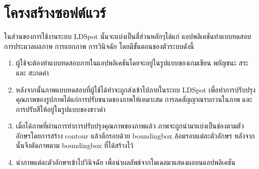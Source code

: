 \documentclass[12pt,oneside,openright,a4paper]{cpe-thai-project}
\begin{document}
\section{โครงสร้างซอฟต์แวร์}
ในส่วนของการใช้งานระบบ LDSpot นั้นจะแบ่งเป็นสี่ส่วนหลักๆได้แก่ แอปพลิเคชันทำแบบทดสอบ การประมวลผลภาพ การแยกภาพ การวินิจฉัย โดยมีขั้นตอนของตัวระบบดังนี้
\begin{enumerate}
  \item ผู้ใช้จะต้องทำแบบทดสอบภายในแอปพลิเคชันโดยจะอยู่ในรูปแบบของเกมเขียน พยัญชนะ สระ และ สะกดคำ
  \item หลังจากนั้นภาพแบบทดสอบที่ผู้ใช้ได้ทำจะถูกส่งเข้าไปภายในระบบ LDSpot เพื่อทำการปรับปรุงคุณภาพของรูปภาพได้แก่การปรับขนาดของภาพให้เหมาะสม การลดสัญญาณรบกวนในภาพ และการปรับสีให้อยู่ในรูปแบบของขาวดำ
  \item เมื่อได้ภาพที่ผ่านการทำการปรับปรุงคุณภาพของภาพแล้ว ภาพจะถูกนำมาแบ่งเป็นช่องตามตัวอักษรโดยการสร้าง contour แล้วตีกรอบด้วย boundingbox ล้อมรอบแต่ละตัวอักษร หลังจากนั้นจึงตัดภาพตาม boundingbox ที่ได้สร้างไว้
  \item นำภาพแต่ละตัวอักษรเข้าไปวินิจฉัย เพื่อนำผลลัพธ์จากโมเดลมาแสดงผลบนแอปพลิเคชัน
\end{enumerate}
\end{document}
